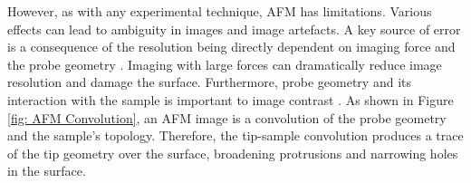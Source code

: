 However, as with any experimental technique, AFM has limitations. Various effects can lead to ambiguity in images and image artefacts. A key source of error is a consequence of the resolution being directly dependent on imaging force and the probe geometry \cite{dufrene2002atomic}. Imaging with large forces can dramatically reduce image resolution and damage the surface. Furthermore, probe geometry and its interaction with the sample is important to image contrast \cite{dufrene2002atomic}. As shown in Figure \ref{fig: AFM Convolution}, an AFM image is a convolution of the probe geometry and the sample's topology. Therefore, the tip-sample convolution produces a trace of the tip geometry over the surface, broadening protrusions and narrowing holes in the surface.

\begin{figure}[ht]
\centering


\end{figure}
